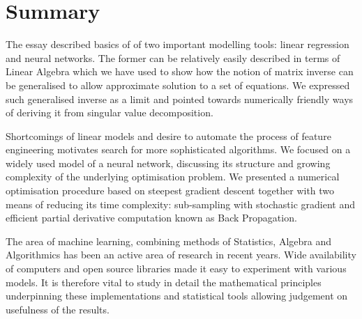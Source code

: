 \documentclass[a4paper,11pt]{article}
\theoremstyle{break}
\begin{document}
\section{Summary}
The essay described basics of of two important modelling tools: linear regression and neural networks.
The former can be relatively easily described in terms of Linear Algebra which we have used to show how the notion of matrix inverse can be generalised to allow approximate solution to a set of equations.
We expressed such generalised inverse as a limit and pointed towards numerically friendly ways of deriving it from singular value decomposition.

Shortcomings of linear models and desire to automate the process of feature engineering motivates search for more sophisticated algorithms.
We focused on a widely used model of a neural network, discussing its structure and growing complexity of the underlying optimisation problem.
We presented a numerical optimisation procedure based on steepest gradient descent together with two means of reducing its time complexity: sub-sampling with stochastic gradient and efficient partial derivative computation known as Back Propagation.

The area of machine learning,  combining methods of Statistics, Algebra and Algorithmics has been an active area of research in recent years.
Wide availability of computers and open source libraries made it easy to experiment with various models.
It is therefore vital to study in detail the mathematical principles underpinning these implementations and statistical tools allowing judgement on usefulness of the results.

\printbibliography

\pagebreak
\tableofcontents
\end{document}
